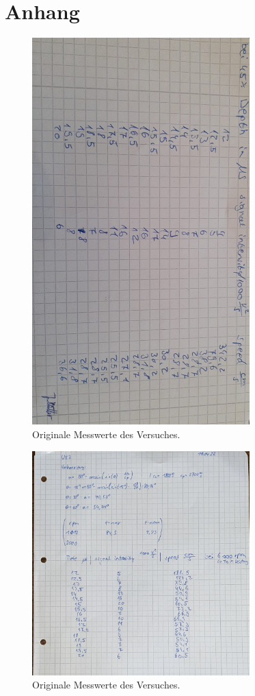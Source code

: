 \section{Anhang}
\label{sec:Anhang}
\begin{figure}
    \centering
    \includegraphics[angle=90, width=0.75\textwidth]{data/origDaten2.png}
    \caption{Originale Messwerte des Versuches.}
    \label{fig:origDaten2}
\end{figure}
\begin{figure}
    \centering
    \includegraphics[width=0.75\textwidth]{data/origDaten1.png}
    \caption{Originale Messwerte des Versuches.}
    \label{fig:origDaten1}
\end{figure}
